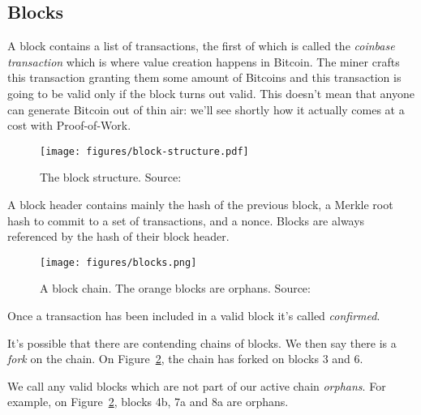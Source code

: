 \subsection{Blocks}
A block contains a list of transactions, the first of which  is called the \emph{coinbase transaction} which is where value creation happens in Bitcoin. The miner crafts this transaction granting them some amount of Bitcoins and this transaction is going to be valid only if the block turns out valid. This doesn't mean that anyone can generate Bitcoin out of thin air: we'll see shortly how it actually comes at a cost with Proof-of-Work.

\begin{figure}
  \centering
  \texttt{[image: figures/block-structure.pdf]}
  \caption{The block structure.  Source:~\cite{bitcoin}}
  \label{fig:block-structure}
\end{figure}

A block header contains mainly the hash of the previous block, a Merkle root hash to commit to a set of transactions, and a nonce. Blocks are always referenced by the hash of their block header.

\begin{figure}
  \centering
  \texttt{[image: figures/blocks.png]}
  \caption{A block chain. The orange blocks are orphans.  Source:~\cite{mastering}}
  \label{fig:blocks}
\end{figure}

Once a transaction has been included in a valid block it's called \emph{confirmed}.

It's possible that there are contending chains of blocks. We then say there is a \emph{fork} on the chain. On Figure~\ref{fig:blocks}, the chain has forked on blocks 3 and 6.

We call any valid blocks which are not part of our active chain \emph{orphans}. For example, on Figure~\ref{fig:blocks}, blocks 4b, 7a and 8a are orphans.

